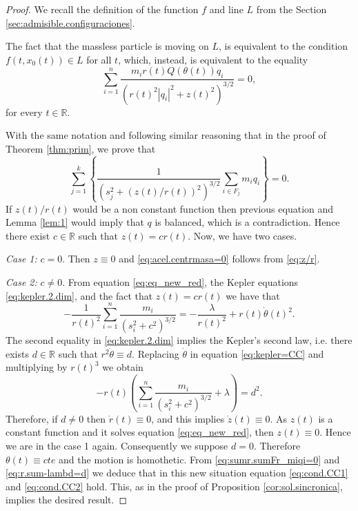 \documentclass[twoside]{article}
\theoremstyle{remark}
\newcommand{\rr}{\mathbb{R}}
\begin{document}
\begin{proof}
 We recall the definition of the function $f$ and line $L$ from the Section \ref{sec:admisible.configuraciones}.

The fact that the massless particle is moving on $L$, is equivalent to the condition $f(t,x_0(t))\in L$ for all $t$, which, instead, is equivalent to the equality
\begin{equation}\label{eq:z/r}
 \sum_{i=1}^n\frac{m_ir(t)Q(\theta (t))q_i}{\left(r(t)^2|q_i|^2+z(t)^2\right)^{3/2}}=0,
\end{equation}
for every $t\in \rr$.

With the same notation and following similar reasoning that in the proof of Theorem \ref{thm:prim}, we prove that
\begin{equation}\label{eq:sumr.sumFr_miqi=0}
\sum_{j=1}^k\left\{\frac{1}{(s_j^{2}+(z(t)/r(t))^2)^{3/2}}\sum_{i\in F_j}m_iq_i\right\}=0.
\end{equation}
If $z(t)/r(t)$  would be a non constant function then previous equation and Lemma \ref{lem:1} would imply that $q$ is balanced, which is a contradiction. Hence there exist $c\in \rr$ such that $z(t)=cr(t)$. Now, we have two cases.

\emph{Case 1:} $c=0$. Then $z\equiv 0$ and \eqref{eq:acel.centrmasa=0} follows from \eqref{eq:z/r}.

\emph{Case 2:} $c\neq 0$. From equation \eqref{eq:eq_new_red}, the Kepler equations \eqref{eq:kepler.2.dim}, and the fact that $z(t)=cr(t)$ we have that
\begin{equation}\label{eq:kepler=CC}
 -\frac{1}{r(t)^2}\sum_{i=1}^{n}\frac{m_i}{(s_i^2+c^2)^{3/2}}=-\frac{\lambda}{r(t)^2}+r(t)\dot{\theta}(t)^2.
\end{equation}
The second equality in \eqref{eq:kepler.2.dim} implies the Kepler's second law, i.e. there exists $d\in\rr$ such that $r^2\dot{\theta}\equiv d$. Replacing $\dot{\theta}$ in equation \eqref{eq:kepler=CC} and multiplying by $r(t)^3$ we obtain
\begin{equation}\label{eq:r.sum-lambd=d}
-r(t)\left(\sum_{i=1}^{n}\frac{m_i}{(s_i^2+c^2)^{3/2}}+\lambda\right)=d^2.
\end{equation}
Therefore, if $d\neq 0$ then $\dot{r}(t)\equiv 0$, and this implies $\dot{z}(t)\equiv 0$. As $z(t)$ is a constant function and it solves equation \eqref{eq:eq_new_red}, then $z(t)\equiv 0$. Hence we are in the case 1 again. Consequently we suppose $d=0$. Therefore $\theta(t)\equiv cte$ and the motion is homothetic. From \eqref{eq:sumr.sumFr_miqi=0} and \eqref{eq:r.sum-lambd=d} we deduce that in this new situation equation \eqref{eq:cond.CC1} and \eqref{eq:cond.CC2} hold. This, as in the proof of Proposition \ref{cor:sol.sincronica}, implies the desired result.
\end{proof}
\end{document}
